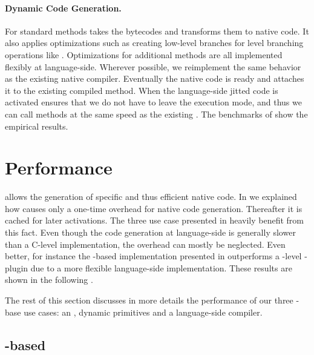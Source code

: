 \paragraph{Dynamic Code Generation.}
For standard methods \Nabujito takes the bytecodes and transforms them to native code.
It also applies optimizations such as creating low-level branches for \PH level branching operations like .
Optimizations for additional methods are all implemented flexibly at language-side.
Wherever possible, we reimplement the same behavior as the existing native \JIT compiler.
Eventually the native code is ready and \B attaches it to the existing compiled method.
When the language-side jitted code is activated \B ensures that we do not have to leave the \JIT execution mode, and thus we can call methods at the same speed as the existing \JIT.
The benchmarks of  show the empirical results.


\section{Performance}
\B allows the generation of specific and thus efficient native code.
In  we explained how \B causes only a one-time overhead for native code generation. 
Thereafter it is cached for later activations.
The three use case presented in  heavily benefit from this fact.
Even though the code generation at language-side is generally slower than a C-level implementation, the overhead can mostly be neglected.
Even better, for instance the \B-based \FFI implementation presented in  outperforms a \VM-level \FFI-plugin due to a more flexible language-side implementation. 
These results are shown in the following .

The rest of this section discusses in more details the performance of our three \B-base use cases: an \FFI, dynamic primitives and a language-side \JIT compiler.

\subsection{\B-based \FFI}

